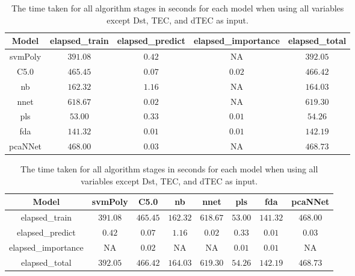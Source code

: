 \begin{table}[!ht]
	\centering
	\begin{tabular}{|c|c|c|c|c|}
		\hline
		Model & elapsed_train & elapsed_predict & elapsed_importance & elapsed_total \\ \hline
		svmPoly & $391.08$ & $0.42$ & NA & $392.05$ \\ \hline
		C5.0 & $465.45$ & $0.07$ & $0.02$ & $466.42$ \\ \hline
		nb & $162.32$ & $1.16$ & NA & $164.03$ \\ \hline
		nnet & $618.67$ & $0.02$ & NA & $619.30$ \\ \hline
		pls & $53.00$ & $0.33$ & $0.01$ & $54.26$ \\ \hline
		fda & $141.32$ & $0.01$ & $0.01$ & $142.19$ \\ \hline
		pcaNNet & $468.00$ & $0.03$ & NA & $468.73$ \\ \hline
	\end{tabular}
	\caption{The time taken for all algorithm stages in seconds for each model when using all variables except Dst, TEC, and dTEC as input.}
	\label{tab:time:noTEC}
\end{table}

\begin{table}[!ht]
	\centering
	\begin{tabular}{|c|c|c|c|c|c|c|c|}
		\hline
		Model & svmPoly & C5.0 & nb & nnet & pls & fda & pcaNNet \\ \hline
		elapsed_train & $391.08$ & $465.45$ & $162.32$ & $618.67$ & $53.00$ & $141.32$ & $468.00$ \\ \hline
		elapsed_predict & $0.42$ & $0.07$ & $1.16$ & $0.02$ & $0.33$ & $0.01$ & $0.03$ \\ \hline
		elapsed_importance & NA & $0.02$ & NA & NA & $0.01$ & $0.01$ & NA \\ \hline
		elapsed_total & $392.05$ & $466.42$ & $164.03$ & $619.30$ & $54.26$ & $142.19$ & $468.73$ \\ \hline
	\end{tabular}
	\caption{The time taken for all algorithm stages in seconds for each model when using all variables except Dst, TEC, and dTEC as input.}
	\label{tab:time:reverse:noTEC}
\end{table}

